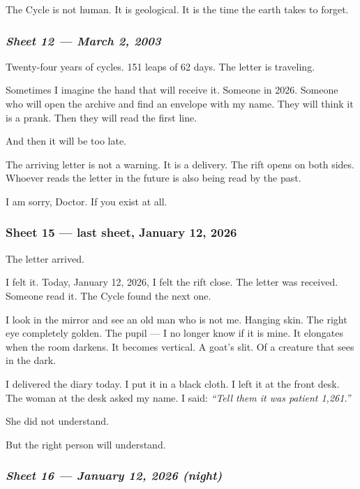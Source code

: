 \noindent The Cycle is not human. It is geological. It is the time the earth takes to forget.

\subsubsection*{\textit{Sheet 12 --- March 2, 2003}}

\noindent Twenty-four years of cycles. 151 leaps of 62 days. The letter is traveling.

\noindent Sometimes I imagine the hand that will receive it. Someone in 2026. Someone who will open the archive and find an envelope with my name. They will think it is a prank. Then they will read the first line.

\noindent And then it will be too late.

\noindent The arriving letter is not a warning. It is a delivery. The rift opens on both sides. Whoever reads the letter in the future is also being read by the past.

\noindent I am sorry, Doctor. If you exist at all.

\subsubsection*{Sheet 15 --- last sheet, January 12, 2026}

\noindent The letter arrived.

\noindent I felt it. Today, January 12, 2026, I felt the rift close. The letter was received. Someone read it. The Cycle found the next one.

\noindent I look in the mirror and see an old man who is not me. Hanging skin. The right eye completely golden. The pupil --- I no longer know if it is mine. It elongates when the room darkens. It becomes vertical. A goat's slit. Of a creature that sees in the dark.

\noindent I delivered the diary today. I put it in a black cloth. I left it at the front desk. The woman at the desk asked my name. I said: \textit{\textquotedblleft{}Tell them it was patient 1,261.\textquotedblright{}}

\noindent She did not understand.

\noindent But the right person will understand.

\subsubsection*{\textit{Sheet 16 --- January 12, 2026 (night)}}

